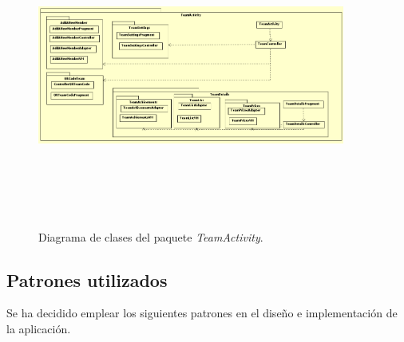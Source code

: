 \documentclass[twoside]{report}
\begin{document}
\begin{figure}[H]
\centering
\includegraphics[height=10cm,width=0.9\textwidth]{images/structureTeam.PNG}
\caption{Diagrama de clases del paquete \textit{TeamActivity}.}
\end{figure}

\subsection{Patrones utilizados}
Se ha decidido emplear los siguientes patrones en el diseño e implementación de la aplicación.
\end{document}
